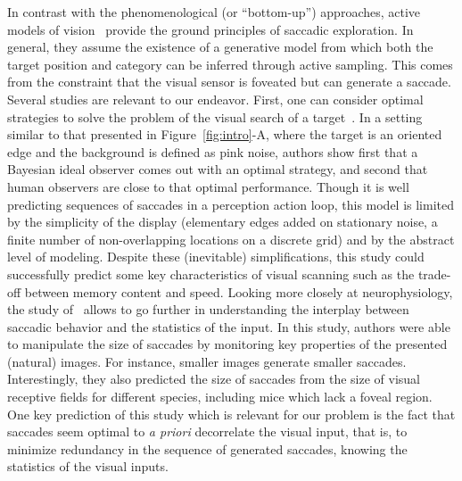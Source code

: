 In contrast with the phenomenological (or ``bottom-up'') approaches, active models of vision~\cite{Najemnik05,Butko2010infomax,dauce2018active} provide the ground principles of saccadic exploration. In general, they assume the existence of a generative model from which both the target position and category can be inferred through active sampling. This comes from the constraint that the visual sensor is foveated but can generate a saccade.
Several studies are relevant to our endeavor. First, one can consider optimal strategies to solve the problem of the visual search of a target~\cite{Najemnik05}. In a setting similar to that presented in Figure~\ref{fig:intro}-A, where the target is an oriented edge and the background is defined as pink noise, authors show first that a Bayesian ideal observer comes out with an optimal strategy, and second that human observers are close to that optimal performance. Though it is well predicting sequences of saccades in a perception action loop, this model is limited by the simplicity of the display (elementary edges added on stationary noise, a finite number of non-overlapping locations on a discrete grid) and by the abstract level of modeling. Despite these (inevitable) simplifications, this study could successfully predict some key characteristics of visual scanning such as the trade-off between memory content and speed. Looking more closely at neurophysiology, the study of~\cite{Samonds18} allows to go further in understanding the interplay between saccadic behavior and the statistics of the input. In this study, authors were able to manipulate the size of saccades by monitoring key properties of the presented (natural) images. For instance, smaller images generate smaller saccades. Interestingly, they also predicted the size of saccades from the size of visual receptive fields for different species, including mice which lack a foveal region. One key prediction of this study which is relevant for our problem is the fact that saccades seem optimal to \emph{a priori} decorrelate the visual input, that is, to minimize redundancy in the sequence of generated saccades, knowing the statistics of the visual inputs.

